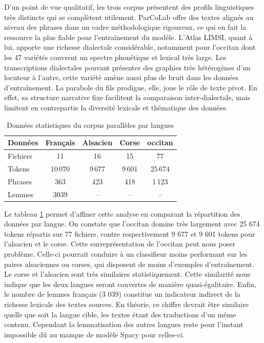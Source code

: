 D'un point de vue qualitatif, les trois corpus présentent des profils linguistiques très distincts qui se
complètent utilement. ParCoLab offre des textes alignés au niveau des phrases dans un cadre méthodologique
rigoureux, ce qui en fait la ressource la plus fiable pour l'entraînement du modèle. L'Atlas LIMSI,
quant à lui, apporte une richesse dialectale considérable, notamment pour l'occitan dont les 47 variétés
couvrent un spectre phonétique et lexical très large. Les transcriptions dialectales pouvant présenter
des graphies très hétérogènes d'un locuteur à l'autre, cette variété amène aussi plus de bruit dans les données
d'entraînement. La parabole du fils prodigue, elle, joue le rôle de texte pivot.
En effet, sa structure narrative fixe facilitent la comparaison inter-dialectale, mais limitent en
contrepartie la diversité lexicale et thématique des données.

\begin{table}[h!]
\centering
\begin{tabular}{lcccc}
\hline
\textbf{Données} & \textbf{Français} & \textbf{Alsacien} & \textbf{Corse} & \textbf{occitan} \\
\hline
Fichiers & 11 & 16 & 15 & 77 \\
Tokens & 10\,070 & 9\,677 & 9\,601 & 25\,674 \\
Phrases & 363 & 423 & 418 & 1\,123 \\
Lemmes & 3039 & -- & -- & -- \\
\hline
\end{tabular}
\caption{Données statistiques du corpus parallèles par langues}
\label{table_donnees_par_langues}
\end{table}

Le tableau \ref{table_donnees_par_langues} permet d'affiner cette analyse en comparant la répartition des
données par langue. On constate que l'occitan domine très largement avec {25 674} tokens répartis sur 77 fichiers,
contre respectivement {9 677} et {9 601} tokens pour l'alsacien et le corse. Cette surreprésentation de
l'occitan peut nous poser problème. Celle-ci pourrait conduire à un classifieur moins performant sur les
paires alsaciennes ou corses, qui disposent de moins d'exemples d'entraînement.
Le corse et l'alsacien sont très similaires statistiquement. Cette similarité nous indique que les deux
langues seront couvertes de manière quasi-égalitaire. Enfin, le nombre de lemmes français ({3 039}) constitue
un indicateur indirect de la richesse lexicale des textes sources. En théorie, ce chiffre devrait être
similaire quelle que soit la langue cible, les textes étant des traductions d'un même contenu.
Cependant la lemmatisation des autres langues reste pour l'instant impossible dû au manque de modèle Spacy
pour celles-ci.

